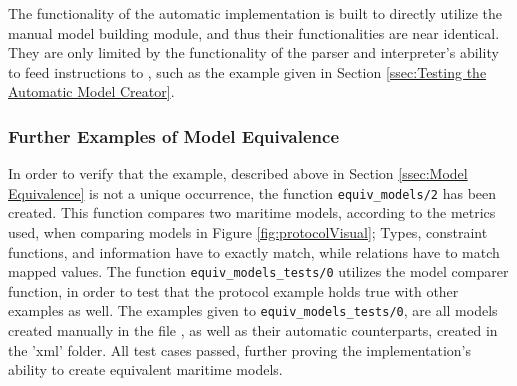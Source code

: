 The functionality of the automatic implementation is built to directly utilize the manual model building module, and thus their functionalities are near identical. They are only limited by the functionality of the parser and interpreter's ability to feed instructions to , such as the example given in Section \ref{ssec:Testing the Automatic Model Creator}.

\subsubsection{Further Examples of Model Equivalence}

In order to verify that the example, described above in Section \ref{ssec:Model Equivalence} is not a unique occurrence, the function \lstinline{equiv_models/2} has been created. This function compares two maritime models, according to the metrics used, when comparing models in Figure \ref{fig:protocolVisual}; Types, constraint functions, and information have to exactly match, while relations have to match mapped values. The function \lstinline{equiv_models_tests/0} utilizes the model comparer function, in order to test that the protocol example holds true with other examples as well. The examples given to \lstinline{equiv_models_tests/0}, are all models created manually in the file , as well as their automatic counterparts, created in the 'xml' folder. All test cases passed, further proving the implementation's ability to create equivalent maritime models.
